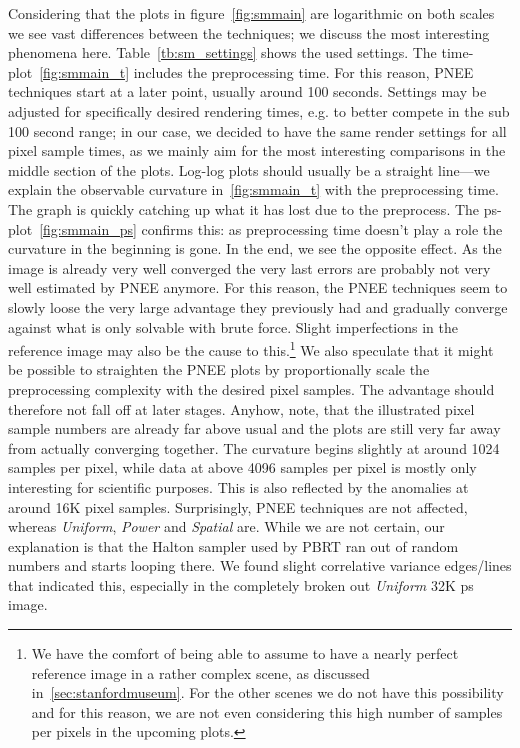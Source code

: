 Considering that the plots in figure~\ref{fig:smmain} are logarithmic on both scales we see vast differences between the techniques; we discuss the most interesting phenomena here. Table~\ref{tb:sm_settings} shows the used settings. The time-plot~\ref{fig:smmain_t} includes the preprocessing time. For this reason, PNEE techniques start at a later point, usually around 100 seconds. Settings may be adjusted for specifically desired rendering times, e.g. to better compete in the sub 100 second range; in our case, we decided to have the same render settings for all pixel sample times, as we mainly aim for the most interesting comparisons in the middle section of the plots. Log-log plots should usually be a straight line---we explain the observable curvature in~\ref{fig:smmain_t} with the preprocessing time. The graph is quickly catching up what it has lost due to the preprocess. The ps-plot~\ref{fig:smmain_ps} confirms this: as preprocessing time doesn't play a role the curvature in the beginning is gone. In the end, we see the opposite effect. As the image is already very well converged the very last errors are probably not very well estimated by PNEE anymore. For this reason, the PNEE techniques seem to slowly loose the very large advantage they previously had and gradually converge against what is only solvable with brute force. Slight imperfections in the reference image may also be the cause to this.\footnote{We have the comfort of being able to assume to have a nearly perfect reference image in a rather complex scene, as discussed in~\ref{sec:stanfordmuseum}. For the other scenes we do not have this possibility and for this reason, we are not even considering this high number of samples per pixels in the upcoming plots.} We also speculate that it might be possible to straighten the PNEE plots by proportionally scale the preprocessing complexity with the desired pixel samples. The advantage should therefore not fall off at later stages. Anyhow, note, that the illustrated pixel sample numbers are already far above usual and the plots are still very far away from actually converging together. The curvature begins slightly at around 1024 samples per pixel, while data at above 4096 samples per pixel is mostly only interesting for scientific purposes. This is also reflected by the anomalies at around 16K pixel samples. Surprisingly, PNEE techniques are not affected, whereas \textit{Uniform}, \textit{Power} and \textit{Spatial} are. While we are not certain, our explanation is that the Halton sampler used by PBRT ran out of random numbers and starts looping there. We found slight correlative variance edges/lines that indicated this, especially in the completely broken out \textit{Uniform} 32K ps image.

